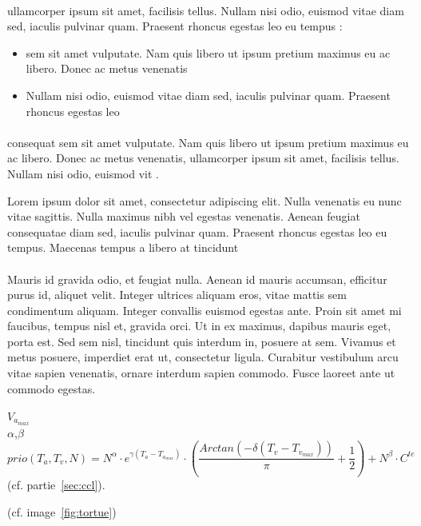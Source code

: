 \documentclass[../main.tex]{subfiles}
\begin{document}
\paragraph{}
ullamcorper ipsum sit amet, facilisis tellus. Nullam nisi odio, euismod vitae diam sed, iaculis pulvinar quam. Praesent rhoncus egestas leo eu tempus :
\newline

\begin{itemize}
\item sem sit amet vulputate. Nam quis libero ut ipsum pretium maximus eu ac libero. Donec ac metus venenatis
\item Nullam nisi odio, euismod vitae diam sed, iaculis pulvinar quam. Praesent rhoncus egestas leo
\end{itemize}

\paragraph{}
consequat sem sit amet vulputate. Nam quis libero ut ipsum pretium maximus eu ac libero. Donec ac metus venenatis, ullamcorper ipsum sit amet, facilisis tellus. Nullam nisi odio, euismod vit .

Lorem ipsum dolor sit amet, consectetur adipiscing elit. Nulla venenatis eu nunc vitae sagittis. Nulla maximus nibh vel egestas venenatis. Aenean feugiat consequatae diam sed, iaculis pulvinar quam. Praesent rhoncus egestas leo eu tempus. Maecenas tempus a libero at tincidunt


\paragraph{}
Mauris id gravida odio, et feugiat nulla. Aenean id mauris accumsan, efficitur purus id, aliquet velit. Integer ultrices aliquam eros, vitae mattis sem condimentum aliquam. Integer convallis euismod egestas ante. Proin sit amet mi faucibus, tempus nisl et, gravida orci. Ut in ex maximus, dapibus mauris eget, porta est. Sed sem nisl, tincidunt quis interdum in, posuere at sem. Vivamus et metus posuere, imperdiet erat ut, consectetur ligula. Curabitur vestibulum arcu vitae sapien venenatis, ornare interdum sapien commodo. Fusce laoreet ante ut commodo egestas.


\paragraph{}
$V_{a_{max}}$\\
$\alpha$,$\beta$\\
\begin{displaymath}
prio(T_a, T_v, N) = N^{\alpha} \cdot e^{{\gamma}\left(T_a - T_{a_{max}}\right)} \cdot \left( \frac{Arctan\left(-\delta \left( T_v - T_{v_{max}}\right)\right)}{\pi} + \frac{1}{2}\right)+N^{\beta}\cdot C^{te}
\end{displaymath}
(cf. partie~\ref{sec:ccl}).\\

(cf. image~\ref{fig:tortue})
\end{document}
